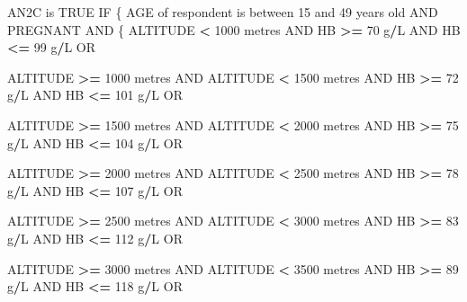 \documentclass[12pt,a4paper]{article}
\newenvironment{Shaded}{\begin{snugshade}}{\end{snugshade}}
\newcommand{\DecValTok}[1]{\textcolor[rgb]{0.00,0.00,0.81}{#1}}
\newcommand{\NormalTok}[1]{#1}
\newcommand{\OperatorTok}[1]{\textcolor[rgb]{0.81,0.36,0.00}{\textbf{#1}}}
\newcommand{\OtherTok}[1]{\textcolor[rgb]{0.56,0.35,0.01}{#1}}
\newcommand{\StringTok}[1]{\textcolor[rgb]{0.31,0.60,0.02}{#1}}
\begin{document}
\begin{Shaded}
\begin{Highlighting}[]
\NormalTok{AN2C is }\OtherTok{TRUE}\NormalTok{ IF}
\NormalTok{  \{}
\NormalTok{    AGE of respondent is between }\DecValTok{15}\NormalTok{ and }\DecValTok{49}\NormalTok{ years old AND PREGNANT AND}
\NormalTok{      \{}
\NormalTok{        ALTITUDE }\OperatorTok{<}\StringTok{ }\DecValTok{1000}\NormalTok{ metres AND HB }\OperatorTok{>=}\StringTok{ }\DecValTok{70}\NormalTok{ g}\OperatorTok{/}\NormalTok{L AND HB }\OperatorTok{<=}\StringTok{ }\DecValTok{99}\NormalTok{ g}\OperatorTok{/}\NormalTok{L OR}
     
\NormalTok{        ALTITUDE }\OperatorTok{>=}\StringTok{ }\DecValTok{1000}\NormalTok{ metres AND ALTITUDE }\OperatorTok{<}\StringTok{ }\DecValTok{1500}\NormalTok{ metres AND }
\NormalTok{          HB }\OperatorTok{>=}\StringTok{ }\DecValTok{72}\NormalTok{ g}\OperatorTok{/}\NormalTok{L AND HB }\OperatorTok{<=}\StringTok{ }\DecValTok{101}\NormalTok{ g}\OperatorTok{/}\NormalTok{L OR}
     
\NormalTok{        ALTITUDE }\OperatorTok{>=}\StringTok{ }\DecValTok{1500}\NormalTok{ metres AND ALTITUDE }\OperatorTok{<}\StringTok{ }\DecValTok{2000}\NormalTok{ metres AND }
\NormalTok{          HB }\OperatorTok{>=}\StringTok{ }\DecValTok{75}\NormalTok{ g}\OperatorTok{/}\NormalTok{L AND HB }\OperatorTok{<=}\StringTok{ }\DecValTok{104}\NormalTok{ g}\OperatorTok{/}\NormalTok{L OR}

\NormalTok{        ALTITUDE }\OperatorTok{>=}\StringTok{ }\DecValTok{2000}\NormalTok{ metres AND ALTITUDE }\OperatorTok{<}\StringTok{ }\DecValTok{2500}\NormalTok{ metres AND }
\NormalTok{          HB }\OperatorTok{>=}\StringTok{ }\DecValTok{78}\NormalTok{ g}\OperatorTok{/}\NormalTok{L AND HB }\OperatorTok{<=}\StringTok{ }\DecValTok{107}\NormalTok{ g}\OperatorTok{/}\NormalTok{L OR}

\NormalTok{        ALTITUDE }\OperatorTok{>=}\StringTok{ }\DecValTok{2500}\NormalTok{ metres AND ALTITUDE }\OperatorTok{<}\StringTok{ }\DecValTok{3000}\NormalTok{ metres AND }
\NormalTok{          HB }\OperatorTok{>=}\StringTok{ }\DecValTok{83}\NormalTok{ g}\OperatorTok{/}\NormalTok{L AND HB }\OperatorTok{<=}\StringTok{ }\DecValTok{112}\NormalTok{ g}\OperatorTok{/}\NormalTok{L OR}

\NormalTok{        ALTITUDE }\OperatorTok{>=}\StringTok{ }\DecValTok{3000}\NormalTok{ metres AND ALTITUDE }\OperatorTok{<}\StringTok{ }\DecValTok{3500}\NormalTok{ metres AND }
\NormalTok{          HB }\OperatorTok{>=}\StringTok{ }\DecValTok{89}\NormalTok{ g}\OperatorTok{/}\NormalTok{L AND HB }\OperatorTok{<=}\StringTok{ }\DecValTok{118}\NormalTok{ g}\OperatorTok{/}\NormalTok{L OR}


\end{Highlighting}
\end{Shaded}
\end{document}
